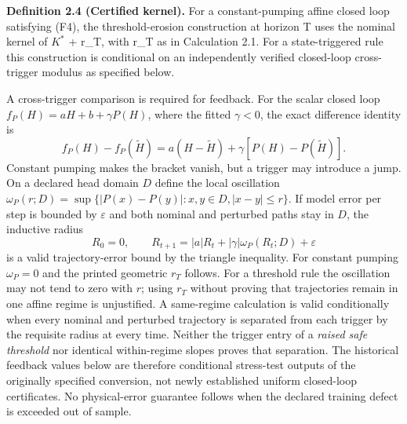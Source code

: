 \documentclass[11pt]{article}
\begin{document}
\textbf{Definition 2.4 (Certified kernel).} For a constant-pumping affine closed loop satisfying (F4), the
threshold-erosion construction at horizon T uses the nominal kernel
of \(K^{\ast}\) + r\_T, with r\_T as in Calculation 2.1. For a
state-triggered rule this construction is conditional on an independently
verified closed-loop cross-trigger modulus as specified below.

A cross-trigger comparison is required for feedback. For the scalar
closed loop $f_P(H)=aH+b+\gamma P(H)$, where the fitted
$\gamma<0$, the exact difference identity is
\[
f_P(H)-f_P(\widetilde H)=a(H-\widetilde H)
+\gamma[P(H)-P(\widetilde H)].
\]
Constant pumping makes the bracket vanish, but a trigger may introduce
a jump. On a declared head domain $D$ define the local oscillation
$\omega_P(r;D)=\sup\{|P(x)-P(y)|:x,y\in D,|x-y|\le r\}$.
If model error per step is bounded by $\varepsilon$ and both nominal
and perturbed paths stay in $D$, the inductive radius
\[
R_0=0,\qquad R_{t+1}=|a|R_t+|\gamma|\omega_P(R_t;D)+\varepsilon
\]
is a valid trajectory-error bound by the triangle inequality. For
constant pumping $\omega_P=0$ and the printed geometric $r_T$ follows.
For a threshold rule the oscillation may not tend to zero with $r$;
using $r_T$ without proving that trajectories remain in one affine
regime is unjustified. A same-regime calculation is valid conditionally
when every nominal and perturbed trajectory is separated from each
trigger by the requisite radius at every time. Neither the trigger
entry of a \emph{raised safe threshold} nor identical within-regime
slopes proves that separation. The historical feedback values below
are therefore conditional stress-test outputs of the originally
specified conversion, not newly established uniform closed-loop
certificates. No physical-error guarantee follows when the declared
training defect is exceeded out of sample.
\end{document}
